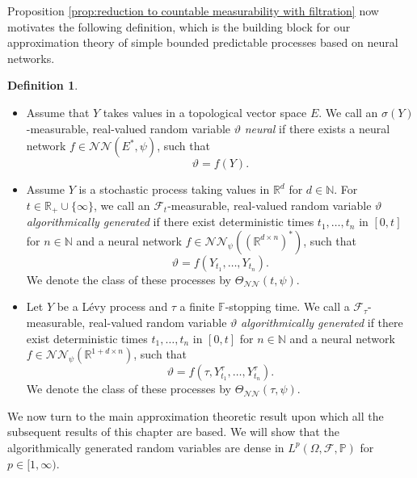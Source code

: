 \documentclass[11pt,a4paper,twoside,openany]{report}
\numberwithin{equation}{section}
\theoremstyle{plain} %
\theoremstyle{definition} %
\newtheorem{definition}[theorem]{Definition}
\theoremstyle{remark} %
\begin{document}
Proposition \ref{prop:reduction to countable measurability with filtration} now motivates the following definition, which is the building block for our approximation theory of simple bounded predictable processes based on neural networks. 
\begin{definition}\label{def:algorithmic strategies}
    \begin{itemize}
        \item Assume that \(Y\) takes values in a topological vector space \(E\). We call an \(\sigma(Y)\)-measurable, real-valued random variable \(\vartheta\) \textit{neural} if there exists a neural network \(f\in\mathcal{NN}(E^*,\psi)\), such that 
        \begin{equation*}
            \vartheta = f(Y).
        \end{equation*}
        \item Assume \(Y\) is a stochastic process taking values in \(\mathbb{R}^d\) for \(d\in\mathbb{N}\). For \(t\in\mathbb{R}_+\cup\{\infty\}\), we call an \(\mathcal{F}_t\)-measurable, real-valued random variable \(\vartheta\) \textit{algorithmically generated} if there exist deterministic times 
        \(t_1,\dots,t_n\) in \([0,t]\) for \(n\in\mathbb{N}\) and a neural network \(f\in\mathcal{NN}_\psi((\mathbb{R}^{d\times n})^*)\), such that
        \begin{equation*}
            \vartheta = f(Y_{t_1},\dots,Y_{t_n}).
        \end{equation*}
        We denote the class of these processes by \(\Theta_{\mathcal{NN}}(t,\psi)\). 
        \item
        Let \(Y\) be a Lévy process and \(\tau\) a finite \(\mathbb{F}\)-stopping time. We call a \(\mathcal{F}_{\tau}\)-measurable, real-valued random variable \(\vartheta\) \textit{algorithmically generated} if there exist deterministic times 
        \(t_1,\dots,t_n\) in \([0,t]\) for \(n\in\mathbb{N}\) and a neural network \(f\in\mathcal{NN}_\psi(\mathbb{R}^{1+d\times n})\), such that
        \begin{equation*}
            \vartheta = f(\tau,Y^{\tau}_{t_1},\dots,Y^{\tau}_{t_n}).
        \end{equation*}
        We denote the class of these processes by \(\Theta_{\mathcal{NN}}(\tau,\psi)\). 
    \end{itemize}
\end{definition}
We now turn to the main approximation theoretic result upon which all the subsequent results of this chapter are based. We will show that the algorithmically generated random variables are dense in \(L^p(\Omega,\mathcal{F},\mathbb{P})\) for \(p\in[1,\infty)\).
\end{document}
